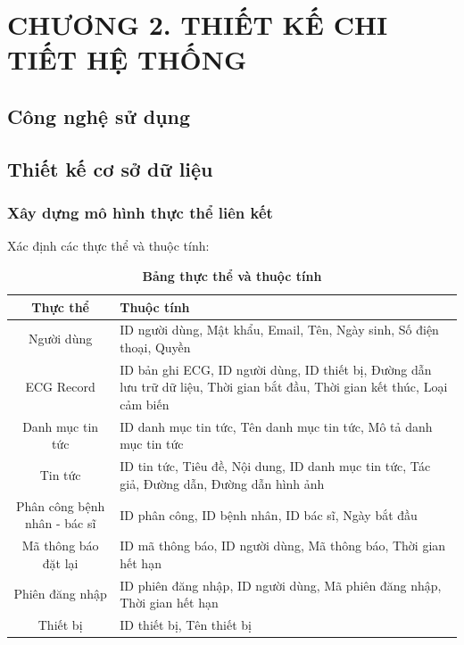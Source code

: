 
\section*{CHƯƠNG 2. THIẾT KẾ CHI TIẾT HỆ THỐNG}
\setcounter{section}{2}
\setcounter{subsection}{0} %
\setcounter{table}{0} %
\setcounter{figure}{0} %

\subsection{Công nghệ sử dụng}



\subsection{Thiết kế cơ sở dữ liệu}

\subsubsection{Xây dựng mô hình thực thể liên kết}

Xác định các thực thể và thuộc tính:


\begin{table}[H]
  \caption{\bfseries \fontsize{12pt}{0pt}\selectfont Bảng thực thể và thuộc tính}
  \centering
  \begin{tabularx}{0.9\textwidth}{|c|X|}
    \hline
    \textbf{Thực thể} & \textbf{Thuộc tính} \\
    \hline
    Người dùng & 
    ID người dùng, Mật khẩu, Email, Tên, Ngày sinh, Số điện thoại, Quyền \\
    \hline
    ECG Record & 
    ID bản ghi ECG, ID người dùng, ID thiết bị, Đường dẫn lưu trữ dữ liệu, Thời gian bắt đầu, Thời gian kết thúc, Loại cảm biến \\
    \hline
    Danh mục tin tức & 
    ID danh mục tin tức, Tên danh mục tin tức, Mô tả danh mục tin tức \\
    \hline
    Tin tức & 
    ID tin tức, Tiêu đề, Nội dung, ID danh mục tin tức, Tác giả, Đường dẫn, Đường dẫn hình ảnh \\
    \hline
    Phân công bệnh nhân - bác sĩ & 
    ID phân công, ID bệnh nhân, ID bác sĩ, Ngày bắt đầu \\
    \hline
    Mã thông báo đặt lại & 
    ID mã thông báo, ID người dùng, Mã thông báo, Thời gian hết hạn \\
    \hline
    Phiên đăng nhập & 
    ID phiên đăng nhập, ID người dùng, Mã phiên đăng nhập, Thời gian hết hạn \\
    \hline
    Thiết bị & 
    ID thiết bị, Tên thiết bị \\
    \hline
  \end{tabularx}
\end{table}




